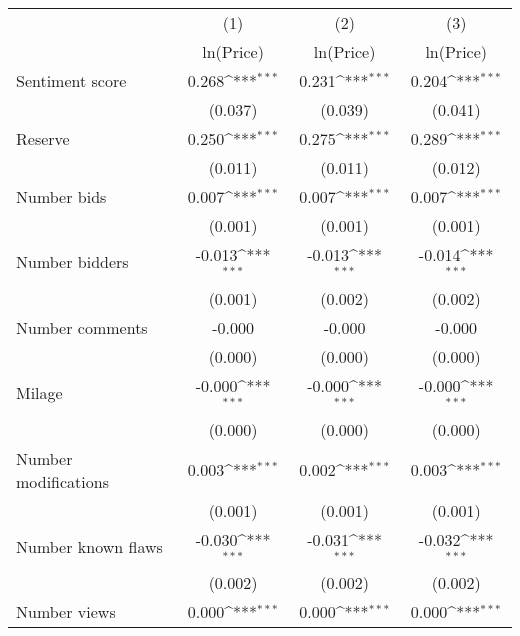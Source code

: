 {
\def\sym#1{\ifmmode^{#1}\else\(^{#1}\)\fi}
\begin{tabular}{l*{3}{c}}
\hline\hline
                    &\multicolumn{1}{c}{(1)}&\multicolumn{1}{c}{(2)}&\multicolumn{1}{c}{(3)}\\
                    &\multicolumn{1}{c}{ln(Price)}&\multicolumn{1}{c}{ln(Price)}&\multicolumn{1}{c}{ln(Price)}\\
\hline
Sentiment score     &       0.268\sym{***}&       0.231\sym{***}&       0.204\sym{***}\\
                    &     (0.037)         &     (0.039)         &     (0.041)         \\
[1em]
Reserve             &       0.250\sym{***}&       0.275\sym{***}&       0.289\sym{***}\\
                    &     (0.011)         &     (0.011)         &     (0.012)         \\
[1em]
Number bids         &       0.007\sym{***}&       0.007\sym{***}&       0.007\sym{***}\\
                    &     (0.001)         &     (0.001)         &     (0.001)         \\
[1em]
Number bidders      &      -0.013\sym{***}&      -0.013\sym{***}&      -0.014\sym{***}\\
                    &     (0.001)         &     (0.002)         &     (0.002)         \\
[1em]
Number comments     &      -0.000         &      -0.000         &      -0.000         \\
                    &     (0.000)         &     (0.000)         &     (0.000)         \\
[1em]
Milage              &      -0.000\sym{***}&      -0.000\sym{***}&      -0.000\sym{***}\\
                    &     (0.000)         &     (0.000)         &     (0.000)         \\
[1em]
Number modifications&       0.003\sym{***}&       0.002\sym{***}&       0.003\sym{***}\\
                    &     (0.001)         &     (0.001)         &     (0.001)         \\
[1em]
Number known flaws  &      -0.030\sym{***}&      -0.031\sym{***}&      -0.032\sym{***}\\
                    &     (0.002)         &     (0.002)         &     (0.002)         \\
[1em]
Number views        &       0.000\sym{***}&       0.000\sym{***}&       0.000\sym{***}\\

\end{tabular}}
